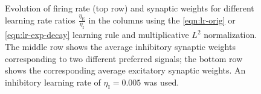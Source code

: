 \documentclass[11pt,a4paper]{scrartcl}
\newcommand{\I}[1]{_{\text{I}#1}}
\newcommand{\E}[1]{_{\text{E}#1}}
\begin{document}
\begin{figure}
    \centering
    \hspace*{2mm}
    \caption{Evolution of firing rate (top row) and synaptic weights for 
        different learning rate ratios $\frac{\eta\E{}}{\eta\I{}}$ in the 
        columns using the  \ref{eqn:lr-orig} or 
         \ref{eqn:lr-exp-decay} learning 
        rule and multiplicative $L^2$ normalization.  The middle row shows the 
        average inhibitory synaptic weights corresponding to two different 
        preferred signals; the bottom row shows the corresponding average 
        excitatory synaptic weights.  An inhibitory learning rate of $\eta\I{} 
        = 0.005$ was used.}
    \label{fig:exc-stdp-mult-l2-main}
\end{figure}
\end{document}
